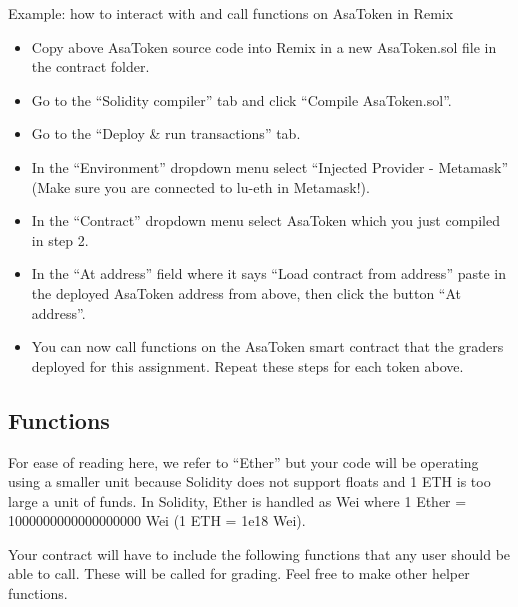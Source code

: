 \documentclass[10pt]{article}
\begin{document}
Example: how to interact with and call functions on AsaToken in Remix
\begin{itemize}
    \item Copy above AsaToken source code into Remix in a new AsaToken.sol file in the contract folder.
    \item Go to the “Solidity compiler” tab and click “Compile AsaToken.sol”.
    \item Go to the “Deploy \& run transactions” tab.  
    \item In the “Environment” dropdown menu select “Injected Provider - Metamask” (Make sure you are connected to lu-eth in Metamask!). 
    \item In the “Contract” dropdown menu select AsaToken which you just compiled in step 2.
    \item In the “At address” field where it says “Load contract from address” paste in the deployed AsaToken address from above, then click the button “At address”.
    \item You can now call functions on the AsaToken smart contract that the graders deployed for this assignment.  Repeat these steps for each token above.
\end{itemize}

\subsection{Functions}

For ease of reading here, we refer to ``Ether''  but your code will be operating using a smaller unit 
because Solidity does not support floats and 1 ETH is too large a unit of funds.  
In Solidity, Ether is handled as Wei where 1 Ether = 1000000000000000000 Wei (1 ETH = 1e18 Wei). 

Your contract will have to include the following functions that any user should be able to call.  These will be called for grading.  Feel free to make other helper functions.
\end{document}
